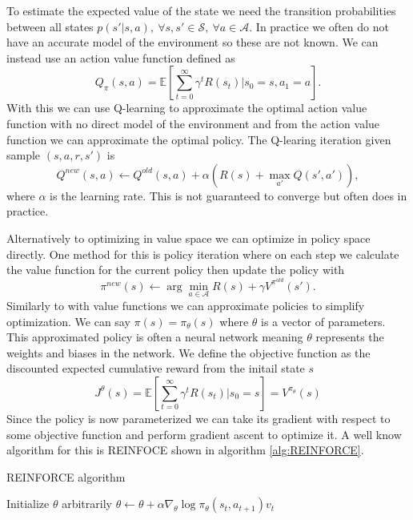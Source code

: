 To estimate the expected value of the state we need the transition probabilities between all states $p(s'|s,a), \ \forall s,s' \in \mathcal{S}, \ \forall a \in \mathcal{A}$. In practice we often do not have an accurate model of the environment so these are not known. We can instead use an action value function defined as 
\begin{equation*}
    Q_\pi(s,a) = \mathbb{E} [ \sum_{t=0}^\infty \gamma^t R(s_t)|s_0=s, a_1=a].
\end{equation*}
With this we can use Q-learning to approximate the optimal action value function with no direct model of the environment and from the action value function we can approximate the optimal policy. The Q-learing iteration given sample $(s,a,r,s')$ is 
\begin{equation*}
    Q^{new}(s,a) \leftarrow Q^{old}(s,a) + \alpha (R(s) + \max_{a'} Q(s',a')),
\end{equation*} 
where $\alpha$ is the learning rate. This is not guaranteed to converge but often does in practice.

Alternatively to optimizing in value space we can optimize in policy space directly. One method for this is policy iteration where on each step we calculate the value function for the current policy then update the policy with 
\begin{equation*}
    \pi^{new}(s) \leftarrow \arg \min_{a \in \mathcal{A}} R(s) + \gamma V^{\pi^{old}}(s').
\end{equation*}
Similarly to with value functions we can approximate policies to simplify optimization. We can say $\pi(s) = \pi_\theta (s)$ where $\theta$ is a vector of parameters. This approximated policy is often a neural network meaning $\theta$ represents the weights and biases in the network. 
We define the objective function as the discounted expected cumulative reward from the initail state $s$ 
\begin{equation*}
    J^\theta(s) = \mathbb{E} [ \sum_{t=0}^\infty \gamma^t R(s_t)|s_0=s] = V^{\pi_\theta}(s)
\end{equation*}
Since the policy is now parameterized we can take its gradient with respect to some objective function and perform gradient ascent to optimize it. A well know algorithm for this is REINFOCE \cite{REINFORCE} shown in algorithm \ref{alg:REINFORCE}.

\begin{algorithm}
    \caption{REINFORCE algorithm}\label{alg:REINFORCE}
    \begin{algorithmic}
            \State Initialize $\theta$ arbitrarily
                    \State $\theta \leftarrow \theta + \alpha \nabla_\theta \log \pi_\theta(s_t,a_{t+1})v_t$ 
                \EndFor
            \EndFor
    \end{algorithmic}
\end{algorithm}




